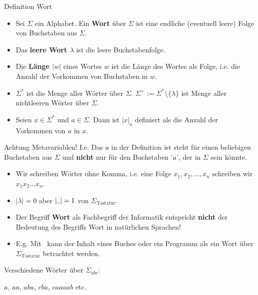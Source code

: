 	
	\begin{mainbox}{Definition Wort}
		\begin{itemize}[label = -]
			\item Sei $\Sigma$ ein Alphabet. Ein \textbf{Wort} über $\Sigma$ ist eine endliche (eventuell leere) Folge von Buchstaben aus $\Sigma$.
			\item Das \textbf{leere Wort $\lambda$} ist die leere Buchstabenfolge.
			
			\item Die \textbf{Länge $|w|$} eines Wortes $w$ ist die Länge des Wortes als Folge, i.e. die Anzahl der Vorkommen von Buchstaben in $w$. 
			\item $\Sigma^*$ ist die Menge aller Wörter über $\Sigma$. $\Sigma^+ := \Sigma^* \setminus \{\lambda\}$ ist Menge aller nichtleeren Wörter über $\Sigma$.
			
			\item Seien $x \in \Sigma^*$ und $a \in \Sigma$. Dann ist $|x|_a$ definiert als die Anzahl der Vorkommen von $a$ in $x$.
		\end{itemize}
	 \end{mainbox}
	 Achtung Metavariablen! I.e. Das $a$ in der Definition ist steht für einen beliebigen Buchstaben aus $\Sigma$ und \textbf{nicht} nur für den Buchstaben '$a$', der in $\Sigma$ sein könnte.  



	
	\begin{itemize}[label = -]
		
		\item Wir schreiben Wörter ohne Komma, i.e. eine Folge $x_1,x_2,...,x_n$ schreiben wir $x_1x_2...x_n$.
		\item $|\lambda| = 0$ aber $|\text{\textvisiblespace}| = 1$ von $\Sigma_{\text{Tastatur}}$.
		\item Der Begriff \textbf{Wort} als Fachbegriff der Informatik entspricht \textbf{nicht} der Bedeutung des Begriffs Wort in natürlichen Sprachen!
		\item E.g. Mit \textvisiblespace \ kann der Inhalt eines Buches oder ein Programm als ein Wort über $\Sigma_{\text{Tastatur}}$ betrachtet werden.
	 \end{itemize}
	 
	 Verschiedene Wörter über $\Sigma_{abc}$:

	 $a$, $aa$, $aba$, $cba$, $caaaab$ etc.



